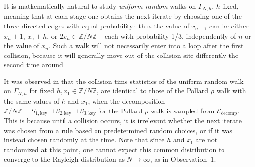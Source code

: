 \documentclass{llncs}
\numberwithin{equation}{section}
\newcommand{\Z}{{\mathbb{Z}}}
\renewcommand\({\left(}
\renewcommand\){\right)}
\begin{document}
It is mathematically natural to study {\it uniform random} walks on $\Gamma_{N,h}$, $h$ fixed, meaning that at each stage one obtains the next iterate by choosing  one of the three directed edges with equal probability:~thus the value of $x_{n+1}$ can be either $x_n+1$, $x_n+h$, or $2x_n\in\Z/N\Z$ -- each with probability 1/3, independently of $n$ or the value of $x_n$.  Such a walk will not necessarily enter into a loop after the first collision, because it will generally move  out of the collision site differently the second time around.

It was observed in \cite{MV1} that the collision time statistics of the uniform random walk on $\Gamma_{N,h}$ for fixed $h,x_1\in \Z/N\Z$, are identical to those of the Pollard $\rho$ walk with the same values of $h$ and $x_1$, when the decomposition   $\Z/N\Z=S_{1,\text{key}}\sqcup S_{2,\text{key}} \sqcup S_{3,\text{key}}$ for the Pollard $\rho$ walk is sampled from $\mathcal E_{\text{decomp}}$.  This is because until a collision occurs, it is irrelevant whether the next iterate was chosen from a rule based on predetermined random choices, or if it was instead chosen randomly at the time.
Note that since $h$ and $x_1$ are not randomized at this point, one cannot expect this common distribution to converge to the Rayleigh distribution as $N\rightarrow\infty$, as  in Observation~1.



\end{document}
